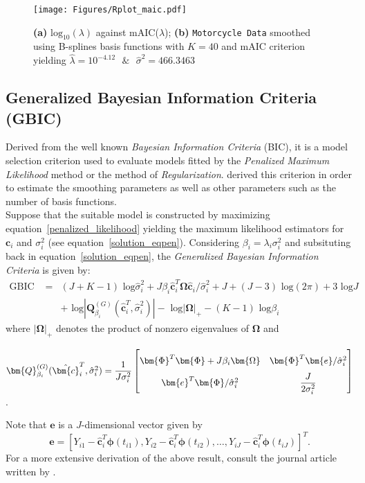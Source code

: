 \begin{figure}[th]
    \texttt{[image: Figures/Rplot\_maic.pdf]}
  \caption[\textit{Penalized Maximum Likelihood} method evaluated using mAIC]{\textbf{(a)} $\text{log}_{10} (\lambda)$ against mAIC($\lambda$); \textbf{(b)} \texttt{Motorcycle Data} smoothed using B-splines basis functions with $K = 40$ and mAIC criterion yielding $\hat{\lambda} = 10^{-4.12}\text{ }\&\text{ }\hat{\sigma}^2 = 466.3463$ }
  \label{fig:maic_plot}
\end{figure}
\clearpage

\subsection{Generalized Bayesian Information Criteria (GBIC)}\label{GBIC} 
Derived from the well known \textit{Bayesian Information Criteria} (BIC), it is a model selection criterion used to evaluate models fitted by the \textit{Penalized Maximum Likelihood} method or the method of \textit{Regularization}. \cite{Konishi2004} derived this criterion in order to estimate the smoothing parameters as well as other parameters such as the number of basis functions.\\
Suppose that the suitable model is constructed by maximizing equation~\eqref{penalized_likelihood} yielding the maximum likelihood estimators for $\bm{c}_i$ and $\sigma^2_i$ (see equation~\ref{solution_eqpen}). Considering $\beta_i = \lambda_i \sigma^2_i$ and subsituting back in equation~\eqref{solution_eqpen}, the \textit{Generalized Bayesian Information Criteria} is given by: 
\begin{eqnarray}
\text{GBIC }&=&(J+K-1)\text{ log}\hat{\sigma}^2_i + J \beta_i\hat{\bm{c}}^T_i \bm{\Omega} \hat{\bm{c}}_i /\hat{\sigma}^2_i + J +(J-3)\text{ log}(2\pi) + 3\text{ log}J \nonumber\\ 
&& + \text{ log} |\bm{Q}_{\beta_i}^{(G)} (\hat{\bm{c}}^T_i,\hat{\sigma}^2_i)| - \text{ log}|\bm{\Omega}|_{+} - (K-1)\text{ log} \beta_i
\end{eqnarray}
where $|\bm{\Omega}| _{+}$ denotes the product of nonzero eigenvalues of $\bm{\Omega}$ and
\begin{center}
$\bm{Q}_{\beta_i}^{(G)} (\hat{\bm{c}}^T_i,\hat{\sigma}^2_i)=\dfrac{1}{J\sigma_i^2}\def\arraystretch{2}
\begin{bmatrix}
\bm{\Phi}^T\bm{\Phi} + J \beta_i \bm{\Omega} & \bm{\Phi}^T \bm{e} / \hat{\sigma}^2_i \\
\bm{e}^T \bm{\Phi} / \hat{\sigma}^2_i & \dfrac{J}{2\sigma_i^2}
\end{bmatrix}$.
\end{center}
Note that $\bm{e}$ is a $J$-dimensional vector given by
\begin{equation*}
\bm{e} = \left[Y_{i1} - \bm{\hat{c}}_i^T\bm{\phi}(t_{i1}),Y_{i2} - \bm{\hat{c}}_i^T\bm{\phi}(t_{i2}),\dots,Y_{iJ} - \bm{\hat{c}}^T_i\bm{\phi}(t_{iJ})\right]^T.
\end{equation*}
For a more extensive derivation of the above result, consult the journal article written by \cite{Konishi1996}.

